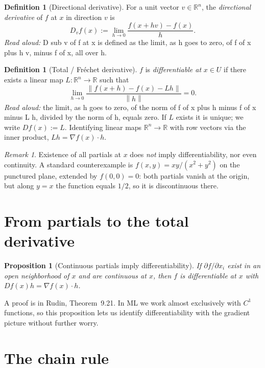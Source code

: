 \documentclass[11pt]{article}
\newtheorem{proposition}[theorem]{Proposition}
\theoremstyle{definition}
\newtheorem{definition}[theorem]{Definition}
\theoremstyle{remark}
\newtheorem{remark}[theorem]{Remark}
\newcommand{\R}{\mathbb{R}}
\newcommand{\norm}[1]{\left\lVert #1 \right\rVert}
\newcommand{\grad}{\nabla}
\begin{document}
\begin{definition}[Directional derivative]
For a unit vector $v \in \R^n$, the \emph{directional derivative} of $f$ at $x$ in direction $v$ is
\[
D_v f(x) := \lim_{h \to 0} \frac{f(x + h v) - f(x)}{h}.
\]
\emph{Read aloud:} D sub v of f at x is defined as the limit, as h goes to zero, of f of x plus h v, minus f of x, all over h.
\end{definition}

\begin{definition}[Total / Fr\'echet derivative]
$f$ is \emph{differentiable at} $x \in U$ if there exists a linear map $L : \R^n \to \R$ such that
\[
\lim_{h \to 0} \frac{\norm{f(x+h) - f(x) - L h}}{\norm{h}} = 0.
\]
\emph{Read aloud:} the limit, as h goes to zero, of the norm of f of x plus h minus f of x minus L h, divided by the norm of h, equals zero.
If $L$ exists it is unique; we write $Df(x) := L$. Identifying linear maps $\R^n \to \R$ with row vectors via the inner product, $L h = \grad f(x) \cdot h$.
\end{definition}

\begin{remark}
Existence of all partials at $x$ does \emph{not} imply differentiability, nor even continuity. A standard counterexample is $f(x,y) = xy/(x^2+y^2)$ on the punctured plane, extended by $f(0,0)=0$: both partials vanish at the origin, but along $y = x$ the function equals $1/2$, so it is discontinuous there.
\end{remark}

\section{From partials to the total derivative}

\begin{proposition}[Continuous partials imply differentiability]\label{prop:c1}
If $\partial f / \partial x_i$ exist in an open neighborhood of $x$ and are continuous at $x$, then $f$ is differentiable at $x$ with $Df(x) h = \grad f(x) \cdot h$.
\end{proposition}

\noindent A proof is in Rudin, Theorem~9.21. In ML we work almost exclusively with $C^1$ functions, so this proposition lets us identify differentiability with the gradient picture without further worry.

\section{The chain rule}
\end{document}
